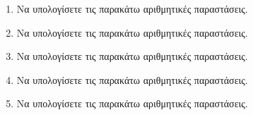 \documentclass[twoside,nofonts,internet]{askhseis}
\begin{document}
\begin{enumerate}
\item Να υπολογίσετε τις παρακάτω αριθμητικές παραστάσεις.
\begin{multicols}{2}
\end{multicols}
\item Να υπολογίσετε τις παρακάτω αριθμητικές παραστάσεις.
\begin{multicols}{2}
\end{multicols}
\item Να υπολογίσετε τις παρακάτω αριθμητικές παραστάσεις.
\item Να υπολογίσετε τις παρακάτω αριθμητικές παραστάσεις.
\item Να υπολογίσετε τις παρακάτω αριθμητικές παραστάσεις.
\end{enumerate}
\end{document}
